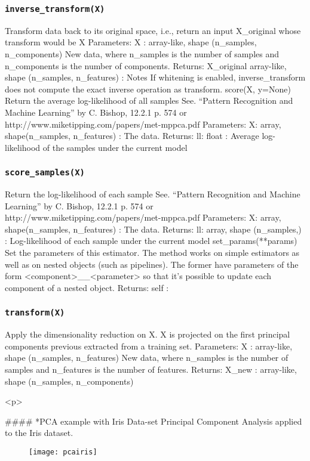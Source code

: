 \subsubsection*{\texttt{inverse_transform(X)}}
Transform data back to its original space, i.e., return an input X_original whose transform would be X
Parameters: 
X : array-like, shape (n_samples, n_components)
New data, where n_samples is the number of samples and n_components is the number of components.
Returns: 
X_original array-like, shape (n_samples, n_features) :
Notes
If whitening is enabled, inverse_transform does not compute the exact inverse operation as transform.
score(X, y=None)
Return the average log-likelihood of all samples
See. “Pattern Recognition and Machine Learning” by C. Bishop, 12.2.1 p. 574 or http://www.miketipping.com/papers/met-mppca.pdf
Parameters: 
X: array, shape(n_samples, n_features) :
The data.
Returns: 
ll: float :
Average log-likelihood of the samples under the current model
\subsubsection*{\texttt{score_samples(X)}}
Return the log-likelihood of each sample
See. “Pattern Recognition and Machine Learning” by C. Bishop, 12.2.1 p. 574 or http://www.miketipping.com/papers/met-mppca.pdf
Parameters: 
X: array, shape(n_samples, n_features) :
The data.
Returns: 
ll: array, shape (n_samples,) :
Log-likelihood of each sample under the current model
set_params(**params)
Set the parameters of this estimator.
The method works on simple estimators as well as on nested objects (such as pipelines). The former have parameters of the form <component>__<parameter> so that it’s possible to update each component of a nested object.
Returns: self :
\subsubsection*{\texttt{transform(X)}}
Apply the dimensionality reduction on X.
X is projected on the first principal components previous extracted from a training set.
Parameters: 
X : array-like, shape (n_samples, n_features)
New data, where n_samples is the number of samples and n_features is the number of features.
Returns: 
X_new : array-like, shape (n_samples, n_components)

<p>

#### *{PCA example with Iris Data-set}
Principal Component Analysis applied to the Iris dataset.
\begin{figure}
\centering
\texttt{[image: pcairis]}
\caption{}
\label{fig:pcairis}
\end{figure}


